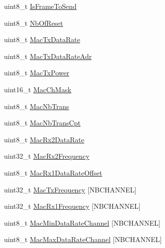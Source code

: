 \begin{DoxyCompactItemize}
\item 
uint8\+\_\+t \mbox{\hyperlink{class_lora_wan_container_af3427d177dc92611f2da1507c147d317}{Is\+Frame\+To\+Send}}
\item 
uint8\+\_\+t \mbox{\hyperlink{class_lora_wan_container_aa4148486bd1d64010191075e267ee538}{Nb\+Of\+Reset}}
\item 
uint8\+\_\+t \mbox{\hyperlink{class_lora_wan_container_a4233437d7d4772f63973fafede72f4b5}{Mac\+Tx\+Data\+Rate}}
\item 
uint8\+\_\+t \mbox{\hyperlink{class_lora_wan_container_a90a66a8b7888673e0568c1202d1d3421}{Mac\+Tx\+Data\+Rate\+Adr}}
\item 
uint8\+\_\+t \mbox{\hyperlink{class_lora_wan_container_ae294fd8611d2487aeb9a8b1185daf8ea}{Mac\+Tx\+Power}}
\item 
uint16\+\_\+t \mbox{\hyperlink{class_lora_wan_container_a64acd2df6bc04cce4d6a54a6a2ff8332}{Mac\+Ch\+Mask}}
\item 
uint8\+\_\+t \mbox{\hyperlink{class_lora_wan_container_a429285e901085c2f0a9b5ddf59f0dc65}{Mac\+Nb\+Trans}}
\item 
uint8\+\_\+t \mbox{\hyperlink{class_lora_wan_container_af9d590d00503086b62b52a233dc790ed}{Mac\+Nb\+Trans\+Cpt}}
\item 
uint8\+\_\+t \mbox{\hyperlink{class_lora_wan_container_aca87f947d0988768d234f64be6ad55b7}{Mac\+Rx2\+Data\+Rate}}
\item 
uint32\+\_\+t \mbox{\hyperlink{class_lora_wan_container_af4018ef9a538f389d20f9c720fcf8ce1}{Mac\+Rx2\+Frequency}}
\item 
uint8\+\_\+t \mbox{\hyperlink{class_lora_wan_container_a26d187a951c769d9419527583d70ee3c}{Mac\+Rx1\+Data\+Rate\+Offset}}
\item 
uint32\+\_\+t \mbox{\hyperlink{class_lora_wan_container_a4cae0887d6a3475147858cd713ab0784}{Mac\+Tx\+Frequency}} \mbox{[}N\+B\+C\+H\+A\+N\+N\+EL\mbox{]}
\item 
uint32\+\_\+t \mbox{\hyperlink{class_lora_wan_container_ad78558332c51d4dc8cc4fde0e85a9c71}{Mac\+Rx1\+Frequency}} \mbox{[}N\+B\+C\+H\+A\+N\+N\+EL\mbox{]}
\item 
uint8\+\_\+t \mbox{\hyperlink{class_lora_wan_container_a2f32e42a487c751f736af790b98aece8}{Mac\+Min\+Data\+Rate\+Channel}} \mbox{[}N\+B\+C\+H\+A\+N\+N\+EL\mbox{]}
\item 
uint8\+\_\+t \mbox{\hyperlink{class_lora_wan_container_a7af736bad42311bdfba5a67fd2701140}{Mac\+Max\+Data\+Rate\+Channel}} \mbox{[}N\+B\+C\+H\+A\+N\+N\+EL\mbox{]}

\end{DoxyCompactItemize}
